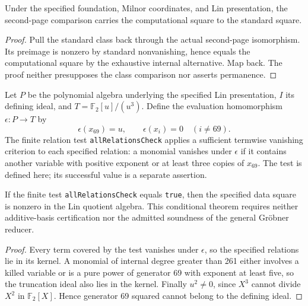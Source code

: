 \begin{proposition}
  \label{prop:h6-fixed-class-comparison}
  \notready
  Under the specified foundation, Milnor coordinates, and Lin presentation,
  the second-page comparison carries the computational square to the
  standard square.
\end{proposition}
\begin{proof}
  Pull the standard class back through the actual second-page isomorphism.
  Its preimage is nonzero by standard nonvanishing, hence equals the
  computational square by the exhaustive internal alternative. Map back.
  The proof neither presupposes the class comparison nor asserts permanence.
\end{proof}

\begin{definition}
  \label{def:lin-square-detector}
  \leanok
  Let $P$ be the polynomial algebra underlying the specified Lin
  presentation, $I$ its defining ideal, and $T=\mathbb F_2[u]/(u^3)$.
  Define the evaluation homomorphism $\epsilon:P\to T$ by
  \[
    \epsilon(x_{69})=u,\qquad\epsilon(x_i)=0\quad(i\ne69).
  \]
  The finite relation test \texttt{allRelationsCheck} applies a sufficient
  termwise vanishing criterion to each specified relation: a monomial
  vanishes under $\epsilon$ if it contains another variable with positive
  exponent or at least three copies of $x_{69}$. The test is defined here;
  its successful value is a separate assertion.
\end{definition}

\begin{proposition}
  \label{prop:lin-square-detector-sound}
  \leanok
  If the finite test \texttt{allRelationsCheck} equals \texttt{true}, then
  the specified data square is nonzero in the Lin quotient algebra.
  This conditional theorem requires neither additive-basis certification
  nor the admitted soundness of the general Gr\"obner reducer.
\end{proposition}
\begin{proof}
  Every term covered by the test vanishes under $\epsilon$, so the
  specified relations lie in its kernel. A monomial of internal
  degree greater than 261 either involves a killed variable or is a pure
  power of generator 69 with exponent at least five, so the truncation
  ideal also lies in the kernel. Finally $u^2\ne0$, since $X^3$ cannot
  divide $X^2$ in $\mathbb F_2[X]$. Hence generator 69 squared cannot
  belong to the defining ideal.
  \leanok
\end{proof}

